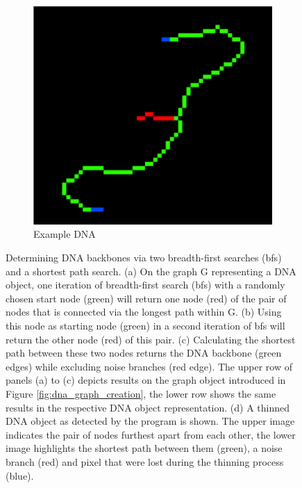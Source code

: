 \documentclass{article}
\begin{document}
\begin{figure}[htb!]
\begin{subfigure}{0.22\textwidth}
		\includegraphics[width=\linewidth]{small_DNA_real_ssp.png}
		\caption{Example DNA}
		\label{fig:dna_real_ssp}
	\end{subfigure}
	\caption{Determining DNA backbones via two breadth-first searches (bfs) and a shortest path search.
		(a) On the graph G representing a DNA object, one iteration of breadth-first search (bfs) with a randomly chosen start node (green) will return one node (red) of the pair of nodes that is connected via the longest path within G. (b) Using this node as starting node (green) in a second iteration of bfs will return the other node (red) of this pair. (c) Calculating the shortest path between these two nodes returns the DNA backbone (green edges) while excluding noise branches (red edge). The upper row of panels (a) to (c) depicts results on the graph object introduced in Figure \ref{fig:dna_graph_creation}, the lower row shows the same results in the respective DNA object representation. (d) A thinned DNA object as detected by the program is shown. The upper image indicates the pair of nodes furthest apart from each other, the lower image highlights the shortest path between them (green), a noise branch (red) and pixel that were lost during the thinning process (blue).}
	\label{fig:dna_backbone_detection}
\end{figure}
\end{document}
